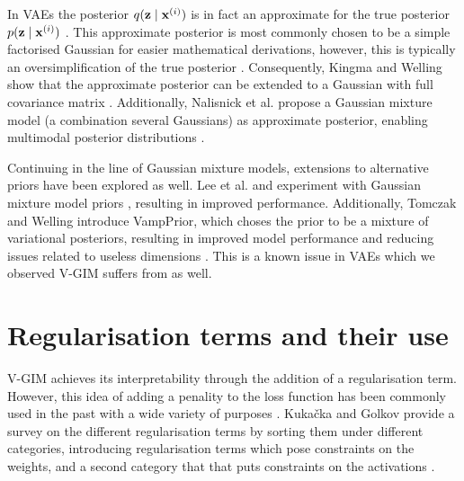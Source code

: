 	In VAEs the posterior $q (\mathbf{z} \mid \mathbf{x}^{(i)})$ is in fact an approximate for the true posterior $p (\mathbf{z} \mid \mathbf{x}^{(i)})$ \cite{odaiboTutorialDerivingStandard2019}. This approximate posterior is most commonly chosen to be a simple factorised Gaussian for easier mathematical derivations, however, this is typically an oversimplification of the true posterior \cite{nalisnickApproximateInferenceDeep}. Consequently, Kingma and Welling show that the approximate posterior can be extended to a Gaussian with full covariance matrix \cite{kingmaIntroductionVariationalAutoencoders2019}. Additionally, Nalisnick et al. propose a Gaussian mixture model (a combination several Gaussians) as approximate posterior, enabling multimodal posterior distributions \cite{nalisnickApproximateInferenceDeep}.
	
	Continuing in the line of Gaussian mixture models, extensions to alternative priors have been explored as well. Lee et al. and experiment with Gaussian mixture model priors \cite{leeMetaGMVAEMixtureGaussian2021, guoVariationalAutoencoderOptimizing2020}, resulting in improved performance. Additionally, Tomczak and Welling introduce VampPrior, which choses the prior to be a mixture of variational posteriors, resulting in improved model performance and reducing issues related to useless dimensions \cite{tomczakVAEVampPrior2018}. This is a known issue in VAEs which we observed V-GIM suffers from as well.
	







\section{Regularisation terms and their use}
	V-GIM achieves its interpretability through the addition of a regularisation term. However, this idea of adding a penality to the loss function has been commonly used in the past with a wide variety of purposes \cite{ComprehensiveSurveyRegularization}. Kukačka and Golkov provide a survey on the different regularisation terms by sorting them under different categories, introducing regularisation terms which pose constraints on the weights, and a second category that that puts constraints on the activations \cite{kukackaRegularizationDeepLearning2017}.
	
